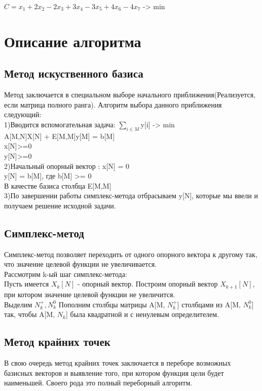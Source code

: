 \documentclass[a4]{article}
\begin{document}
		\begin{center}
			$C = x_1 + 2x_2 - 2x_3 + 3x_4  - 3x_5 + 4x_6 - 4x_7$ -> min
		\end{center}
	\section{Описание алгоритма}
		\subsection{Метод искуственного базиса}
			Метод заключается в специальном выборе начального приближения(Реализуется, если матрица полного ранга). Алгоритм выбора данного приближения следующий:\\
			1)Вводится вспомогательная задача: $\sum_{i \in M}$y[i] -> min\\
			A[M,N]X[N] + E[M,M]y[M] = b[M]\\
			x[N]>=0\\
			y[N]>=0\\
			2)Начальный опорный вектор : x[N] = 0\\
			y[N] = b[M], где b[M] >= 0\\
			В качестве базиса столбца E[M,M]\\
			3)По завершении работы симплекс-метода отбрасываем y[N], которые мы ввели и получаем решение исходной задачи.
		\subsection{Симплекс-метод}
			Симплекс-метод позволяет переходить от одного опорного вектора к другому так, что значение целевой функции не увеличивается.\\
			Рассмотрим k-ый шаг симплекс-метода:\\
			Пусть имеется $X_k[N]$ - опорный вектор. Построим опорный вектор $X_{k + 1}[N]$, при котором значение целевой функции не увеличится.\\
			Выделим $N^+_k, N^0_k$ Пополним столбцы матрицы A[M, $N^+_k$] столбцами из A[M, $N^0_k$] так, чтобы A[M, $N_k$] была квадратной и с ненулевым определителем.
			
		\subsection{Метод крайних точек}
			В свою очередь метод крайних точек заключается в переборе возможных базисных векторов и выявление того, при котором функция цели будет наименьшей. Своего рода это полный переборный алгоритм.
		
\end{document}
